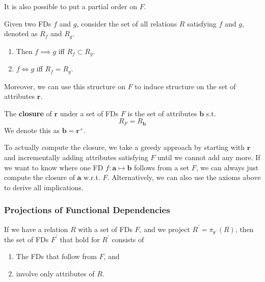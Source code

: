 \documentclass{article}
\begin{document}
      It is also possible to put a partial order on $F$. 

      \begin{definition}
        Given two FDs $f$ and $g$, consider the set of all relations $R$ satisfying $f$ and $g$, denoted as $R_f$ and $R_g$. 
        \begin{enumerate}
          \item Then $f \implies g$ iff $R_f \subset R_g$. 
          \item $f \iff g$ iff $R_f = R_g$. 
        \end{enumerate}
      \end{definition}

      Moreover, we can use this structure on $F$ to induce structure on the set of attributes $\mathbf{r}$. 

      \begin{definition}
        The \textbf{closure} of $\mathbf{r}$ under a set of FDs $F$ is the set of attributes $\mathbf{b}$ s.t. 
        \begin{equation}
          R_F = R_\mathbf{b}
        \end{equation}
        We denote this as $\mathbf{b} = \mathbf{r}^+$. 
      \end{definition}

      To actually compute the closure, we take a greedy approach by starting with $\mathbf{r}$ and incrementally adding attributes satisfying $F$ until we cannot add any more. If we want to know where one FD $f: \mathbf{a} \mapsto \mathbf{b}$ follows from a set $F$, we can always just compute the closure of $\mathbf{a}$ w.r.t. $F$. Alternatively, we can also use the axioms above to derive all implications. 
    
    \subsubsection{Projections of Functional Dependencies} 

      If we have a relation $R$ with a set of FDs $F$, and we project $R^\prime = \pi_{\mathbf{r}^\prime} (R)$, then the set of FDs $F^\prime$ that hold for $R^\prime$ consists of 
      \begin{enumerate}
        \item The FDs that follow from $F$, and 
        \item involve only attributes of $R$. 
      \end{enumerate}
\end{document}
